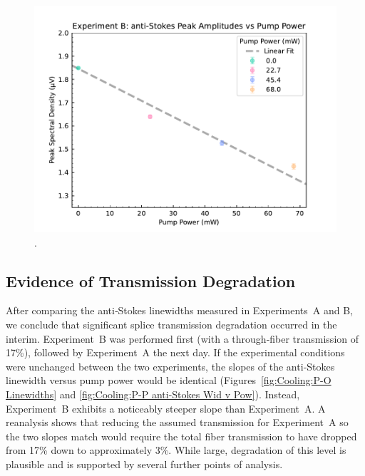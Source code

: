 \begin{figure}[t!]
  \centering
  \includegraphics[width=\textwidth]{figs/3-Cooling/P-P anti-Stokes Height v Pow.pdf}
  \caption{.}
  \label{fig:Cooling:P-P anti-Stokes Height v Pow}
\end{figure}

\subsection{Evidence of Transmission Degradation}
\label{Cooling:subsec:Evidence of Transmission Degradation}

After comparing the anti‐Stokes linewidths measured in Experiments~A and B, we conclude that significant splice transmission degradation occurred in the interim. Experiment~B was performed first (with a through‐fiber transmission of 17\%), followed by Experiment~A the next day. If the experimental conditions were unchanged between the two experiments, the slopes of the anti‐Stokes linewidth versus pump power would be identical (Figures~\ref{fig:Cooling:P-O Linewidths} and \ref{fig:Cooling:P-P anti-Stokes Wid v Pow}). Instead, Experiment~B exhibits a noticeably steeper slope than Experiment~A. A reanalysis shows that reducing the assumed transmission for Experiment~A so the two slopes match would require the total fiber transmission to have dropped from 17\% down to approximately 3\%. While large, degradation of this level is plausible and is supported by several further points of analysis.

